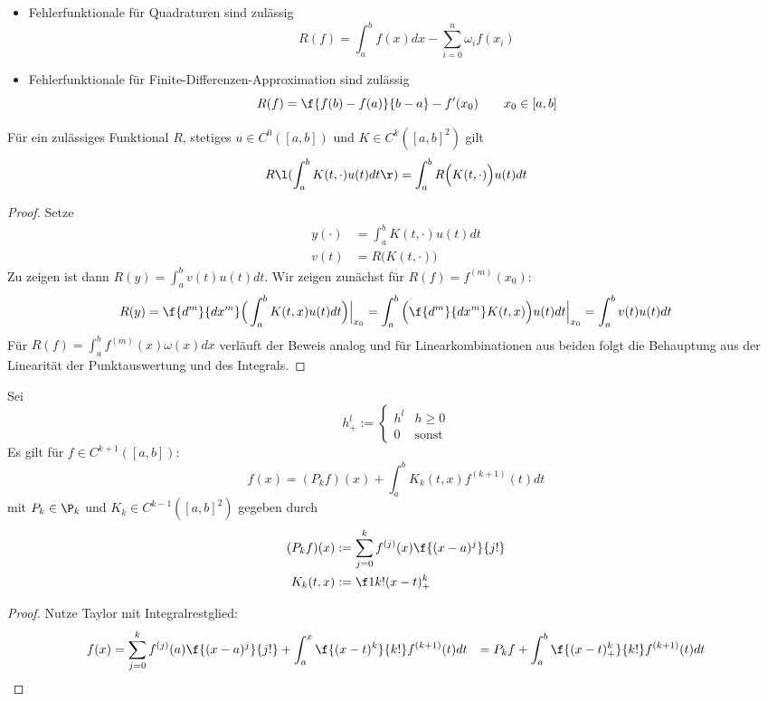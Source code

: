 \documentclass[11pt]{scrbook}
\begin{document}
\begin{ex*}
	\begin{itemize}
		\item
			Fehlerfunktionale für Quadraturen sind zulässig
			\[
				R(f) = \int_a^b f(x) dx - \sum_{i=0}^n \omega_i f(x_i)
			\]
		\item
			Fehlerfunktionale für Finite-Differenzen-Approximation sind zulässig
			\[
				R(f) = \f {f(b)-f(a)}{b-a} - f'(x_0) \qquad x_0\in [a,b]
			\]
	\end{itemize}
\end{ex*}

\begin{lem}[Vertauschungsregel]
	\label{2.28}	
	Für ein zulässiges Funktional $R$, stetiges $u\in C^0([a,b])$ und $K\in C^k([a,b]^2)$ gilt
	\[
		R\l( \int_a^b K(t,\cdot) u(t) dt \r) 
		= \int_a^b R\Big(K(t,\cdot)\Big) u(t) dt
	\]
	\begin{proof}
		Setze
		\begin{align*}
			y(\cdot) &= \int_a^b K(t,\cdot) u(t) dt \\
			v(t) &= R\big(K(t,\cdot)\big)
		\end{align*}
		Zu zeigen ist dann $R(y) = \int_a^b v(t) u(t) dt$.
		Wir zeigen zunächst für $R(f) = f^{(m)}(x_0)$:
		\begin{align*}
			R(y) = \f {d^m}{dx^m} \Big( \int_a^b K(t,x) u(t) dt \Big) \Big|_{x_0}
			= \int_a^b \Big( \f {d^m}{dx^m} K(t,x) \Big) u(t) dt \Big|_{x_0}
			= \int_a^b v(t) u(t) dt
		\end{align*}
		Für $R(f) = \int_a^b f^{(m)}(x) \omega(x) dx$ verläuft der Beweis analog und für Linearkombinationen aus beiden folgt die Behauptung aus der Linearität der Punktauswertung und des Integrals.
	\end{proof}
\end{lem}

\begin{lem}
	\label{2.29}
	Sei 
	\[
		h_+^l := \begin{cases}h^l & h\ge 0 \\ 0 & \text{sonst}\end{cases}
	\]
	Es gilt für $f\in C^{k+1}([a,b])$:
	\[
		f(x) = (P_kf)(x) + \int_a^b K_k(t,x) f^{(k+1)}(t) dt
	\]
	mit $P_k \in \P_k$ und $K_k \in C^{k-1}([a,b]^2)$ gegeben durch
	\begin{align*}
		(P_kf)(x) &:= \sum_{j=0}^k f^{(j)}(x) \f {(x-a)^j}{j!} \\
		K_k(t,x) &:= \f 1{k!}(x-t)^k_+
	\end{align*}
	\begin{proof}
		Nutze Taylor mit Integralrestglied:
		\begin{align*}
			f(x) &= \sum_{j=0}^k f^{(j)}(a) \f {(x-a)^j}{j!} + \int_a^x \f {(x-t)^k}{k!} f^{(k+1)}(t) dt
			&= P_k f + \int_a^b \f {(x-t)^k_+}{k!} f^{(k+1)} (t) dt
		\end{align*}
	\end{proof}
\end{lem}
\end{document}
